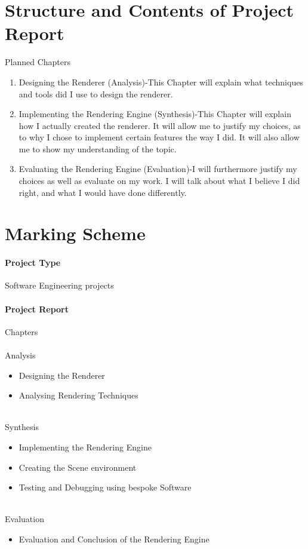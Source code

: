 \documentclass[]{article}
\begin{document}
\section{Structure and Contents of Project Report}
Planned Chapters
\begin{enumerate}
  \item Designing the Renderer (Analysis)-This Chapter will explain what techniques and tools did I use to design the renderer. 
  \item Implementing the Rendering Engine (Synthesis)-This Chapter will explain how I actually created the renderer. It will allow me to justify my choices, as to why I chose to implement certain features the way I did. It will also allow me to show my understanding of the topic.
 
  \item Evaluating the Rendering Engine (Evaluation)-I will furthermore justify my choices as well as evaluate on my work. I will talk about what I believe I did right, and what I would have done differently.
\end{enumerate}

\section{Marking Scheme}
\paragraph{Project Type}Software Engineering projects
\paragraph{Project Report}Chapters \\
\\
Analysis 
\begin{itemize}
  \item Designing the Renderer
  \item Analysing Rendering Techniques
\end{itemize}
\\
Synthesis 
\begin{itemize}
  \item Implementing the Rendering Engine
  \item Creating the Scene environment
  \item Testing and Debugging using bespoke Software
\end{itemize}
\\
Evaluation
\begin{itemize}
    \item Evaluation and Conclusion of the Rendering Engine
\end{itemize}
\end{document}
